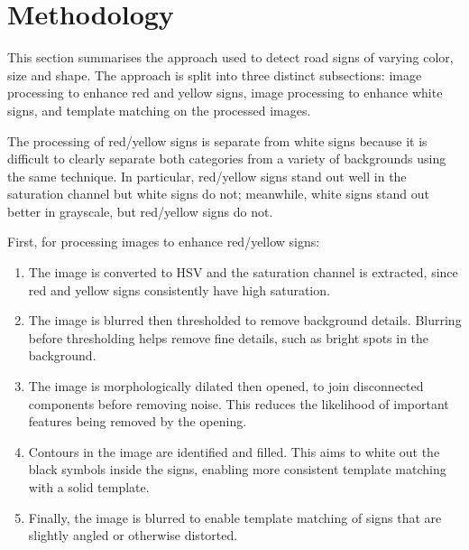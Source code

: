 \newpage
\section{Methodology}

This section summarises the approach used to detect road signs of varying color, size and shape. The approach is split into three distinct subsections: image processing to enhance red and yellow signs, image processing to enhance white signs, and template matching on the processed images.

The processing of red/yellow signs is separate from white signs because it is difficult to clearly separate both categories from a variety of backgrounds using the same technique. In particular, red/yellow signs stand out well in the saturation channel but white signs do not; meanwhile, white signs stand out better in grayscale, but red/yellow signs do not.

First, for processing images to enhance red/yellow signs:
\begin{enumerate}
  \item The image is converted to HSV and the saturation channel is extracted, since red and yellow signs consistently have high saturation.

  \item The image is blurred then thresholded to remove background details. Blurring before thresholding helps remove fine details, such as bright spots in the background.

  \item The image is morphologically dilated then opened, to join disconnected components before removing noise. This reduces the likelihood of important features being removed by the opening.

  \item Contours in the image are identified and filled. This aims to white out the black symbols inside the signs, enabling more consistent template matching with a solid template.

  \item Finally, the image is blurred to enable template matching of signs that are slightly angled or otherwise distorted.

\end{enumerate}

